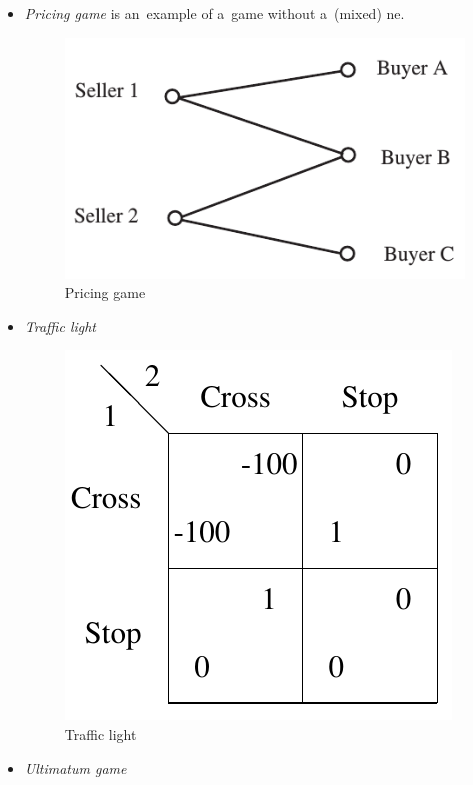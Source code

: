 \begin{itemize}
  \item \emph{Pricing game} is an~example of a~game without a~(mixed) \acrshort{ne}.

    \begin{figure}[H]
      \centering
      \includegraphics[width=\figurewidthratio\paperwidth]{../img/pricing-game.png}
      \caption{Pricing game}
      \label{fig:pricing-game}
    \end{figure}

  \item \emph{Traffic light}

    \begin{figure}[H]
      \centering
      \includegraphics[width=\figurewidthratio\paperwidth]{../img/traffic-light.png}
      \caption{Traffic light}
      \label{fig:traffic-light}
    \end{figure}

  \item \emph{Ultimatum game}
\end{itemize}
